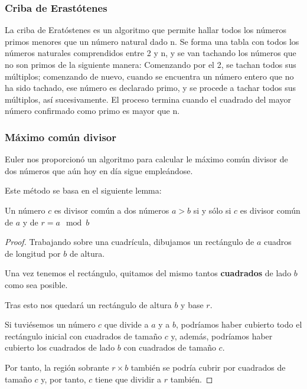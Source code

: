 \documentclass{apuntes}
\begin{document}
\subsubsection{Criba de Erastótenes}
\begin{defn}
La criba de Eratóstenes es un algoritmo que permite hallar todos los números primos menores que un número natural dado n. Se forma una tabla con todos los números naturales comprendidos entre 2 y n, y se van tachando los números que no son primos de la siguiente manera: Comenzando por el 2, se tachan todos sus múltiplos; comenzando de nuevo, cuando se encuentra un número entero que no ha sido tachado, ese número es declarado primo, y se procede a tachar todos sus múltiplos, así sucesivamente. El proceso termina cuando el cuadrado del mayor número confirmado como primo es mayor que n.
\end{defn}

\subsubsection{Máximo común divisor}
Euler nos proporcionó un algoritmo para calcular le máximo común divisor de dos números que aún hoy en día sigue empleándose.

Este método se basa en el siguiente lemma:
\begin{lemma}
Un número $c$ es divisor común a dos números $a>b$ si y sólo si $c$ es divisor común de $a$ y de $r=a\mod b$
\end{lemma}
\begin{proof}
Trabajando sobre una cuadrícula, dibujamos un rectángulo de $a$ cuadros de longitud por $b$ de altura.

Una vez tenemos el rectángulo, quitamos del mismo tantos \textbf{cuadrados} de lado $b$ como sea posible.

Tras esto nos quedará un rectángulo de altura $b$ y base $r$.

\begin{center}
\end{center}

Si tuviésemos un número $c$ que divide a $a$ y a $b$, podríamos haber cubierto todo el rectángulo inicial con cuadrados de tamaño $c$ y, además, podríamos haber cubierto los cuadrados de lado $b$ con cuadrados de tamaño $c$.

Por tanto, la región sobrante $r\times b$ también se podría cubrir por cuadrados de tamaño $c$ y, por tanto, $c$ tiene que dividir a $r$ también.
\end{proof}
\end{document}
